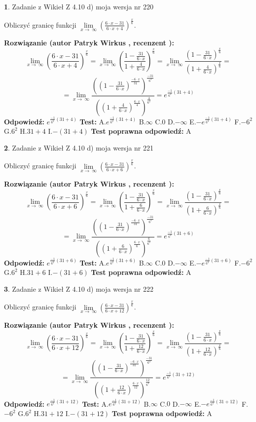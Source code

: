 \documentclass[12pt, a4paper]{article}
\theoremstyle{definition} %
\newtheorem{zad}{}
\newcommand{\zadStart}[1]{\begin{zad}#1\newline}
\newcommand{\zadStop}{\end{zad}}
\newcommand{\rozwStart}[2]{\noindent \textbf{Rozwiązanie (autor #1 , recenzent #2): }\newline}
\newcommand{\rozwStop}{\newline}
\newcommand{\odpStart}{\noindent \textbf{Odpowiedź:}\newline}
\newcommand{\odpStop}{\newline}
\newcommand{\testStart}{\noindent \textbf{Test:}\newline}
\newcommand{\testStop}{\newline}
\newcommand{\kluczStart}{\noindent \textbf{Test poprawna odpowiedź:}\newline}
\newcommand{\kluczStop}{\newline}
\begin{document}
\zadStart{Zadanie z Wikieł Z 4.10 d) moja wersja nr 220}


Obliczyć granicę funkcji  $\lim\limits_{x\to\ \infty}(\frac{6\cdot x-31}{6\cdot x+4})^{\frac{x}{6}}$.
\zadStop
\rozwStart{Patryk Wirkus}{}
$$\lim\limits_{x\to\ \infty}(\frac{6\cdot x-31}{6\cdot x+4})^{\frac{x}{6}} = \lim\limits_{x\to\ \infty}(\frac{1-\frac{31}{6\cdot x}}{1+\frac{4}{6\cdot x}})^{\frac{x}{6}}=\lim\limits_{x\to\ \infty}\frac{(1-\frac{31}{6\cdot x})^{\frac{x}{6}}}{(1+\frac{4}{6\cdot x})^{\frac{x}{6}}}=$$
$$=\lim\limits_{x\to\ \infty}\frac{((1-\frac{31}{6\cdot x})^{\frac{-6\cdot x}{31}})^{\frac{-31}{6^{2}}}}{((1+\frac{4}{6\cdot x})^{\frac{6\cdot x}{4}})^{\frac{4}{6^{2}}}}=e^{\frac{-1}{6^{2}}(31+4)}$$
\rozwStop
\odpStart
$e^{\frac{-1}{6^{2}}(31+4)}$
\odpStop
\testStart
A.$e^{\frac{-1}{6^{2}}(31+4)}$ B.$\infty$ C.$0$ D.$-\infty$ E.$-e^{\frac{-1}{6^{2}}(31+4)}$
F.$-6^{2}$ G.$6^{2}$
H.$31+4$
I.$-(31+4)$
\testStop
\kluczStart
A
\kluczStop



\zadStart{Zadanie z Wikieł Z 4.10 d) moja wersja nr 221}


Obliczyć granicę funkcji  $\lim\limits_{x\to\ \infty}(\frac{6\cdot x-31}{6\cdot x+6})^{\frac{x}{6}}$.
\zadStop
\rozwStart{Patryk Wirkus}{}
$$\lim\limits_{x\to\ \infty}(\frac{6\cdot x-31}{6\cdot x+6})^{\frac{x}{6}} = \lim\limits_{x\to\ \infty}(\frac{1-\frac{31}{6\cdot x}}{1+\frac{6}{6\cdot x}})^{\frac{x}{6}}=\lim\limits_{x\to\ \infty}\frac{(1-\frac{31}{6\cdot x})^{\frac{x}{6}}}{(1+\frac{6}{6\cdot x})^{\frac{x}{6}}}=$$
$$=\lim\limits_{x\to\ \infty}\frac{((1-\frac{31}{6\cdot x})^{\frac{-6\cdot x}{31}})^{\frac{-31}{6^{2}}}}{((1+\frac{6}{6\cdot x})^{\frac{6\cdot x}{6}})^{\frac{6}{6^{2}}}}=e^{\frac{-1}{6^{2}}(31+6)}$$
\rozwStop
\odpStart
$e^{\frac{-1}{6^{2}}(31+6)}$
\odpStop
\testStart
A.$e^{\frac{-1}{6^{2}}(31+6)}$ B.$\infty$ C.$0$ D.$-\infty$ E.$-e^{\frac{-1}{6^{2}}(31+6)}$
F.$-6^{2}$ G.$6^{2}$
H.$31+6$
I.$-(31+6)$
\testStop
\kluczStart
A
\kluczStop



\zadStart{Zadanie z Wikieł Z 4.10 d) moja wersja nr 222}


Obliczyć granicę funkcji  $\lim\limits_{x\to\ \infty}(\frac{6\cdot x-31}{6\cdot x+12})^{\frac{x}{6}}$.
\zadStop
\rozwStart{Patryk Wirkus}{}
$$\lim\limits_{x\to\ \infty}(\frac{6\cdot x-31}{6\cdot x+12})^{\frac{x}{6}} = \lim\limits_{x\to\ \infty}(\frac{1-\frac{31}{6\cdot x}}{1+\frac{12}{6\cdot x}})^{\frac{x}{6}}=\lim\limits_{x\to\ \infty}\frac{(1-\frac{31}{6\cdot x})^{\frac{x}{6}}}{(1+\frac{12}{6\cdot x})^{\frac{x}{6}}}=$$
$$=\lim\limits_{x\to\ \infty}\frac{((1-\frac{31}{6\cdot x})^{\frac{-6\cdot x}{31}})^{\frac{-31}{6^{2}}}}{((1+\frac{12}{6\cdot x})^{\frac{6\cdot x}{12}})^{\frac{12}{6^{2}}}}=e^{\frac{-1}{6^{2}}(31+12)}$$
\rozwStop
\odpStart
$e^{\frac{-1}{6^{2}}(31+12)}$
\odpStop
\testStart
A.$e^{\frac{-1}{6^{2}}(31+12)}$ B.$\infty$ C.$0$ D.$-\infty$ E.$-e^{\frac{-1}{6^{2}}(31+12)}$
F.$-6^{2}$ G.$6^{2}$
H.$31+12$
I.$-(31+12)$
\testStop
\kluczStart
A
\kluczStop
\end{document}
